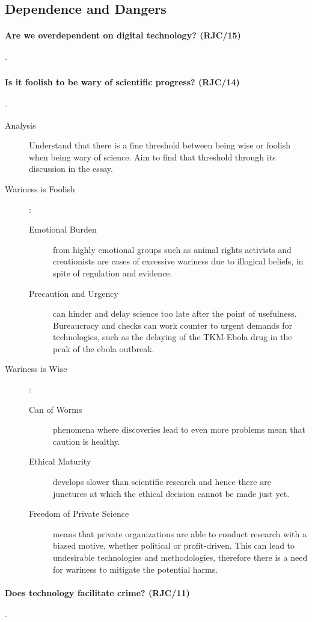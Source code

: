 \documentclass[../../main]{subfiles}
\begin{document}
\subsection{Dependence and Dangers}

\paragraph{Are we overdependent on digital technology? (RJC/15)}-

\paragraph{Is it foolish to be wary of scientific progress? (RJC/14)}-

\begin{description}
	\item[Analysis] Understand that there is a fine threshold between being wise or foolish when being wary of science. Aim to find that threshold through its discussion in the essay.
	\item[Wariness is Foolish] :
		\begin{description}
			\item[Emotional Burden] from highly emotional groups such as animal rights activists and creationists are cases of excessive wariness due to illogical beliefs, in spite of regulation and evidence.
			\item[Precaution and Urgency] can hinder and delay science too late after the point of usefulness. Bureaucracy and checks can work counter to urgent demands for technologies, such as the delaying of the TKM-Ebola drug in the peak of the ebola outbreak.
		\end{description}
	\item[Wariness is Wise] :
		\begin{description}
			\item[Can of Worms] phenomena where discoveries lead to even more problems mean that caution is healthy.
			\item[Ethical Maturity] develops slower than scientific research and hence there are junctures at which the ethical decision cannot be made just yet.
			\item[Freedom of Private Science] means that private organizations are able to conduct research with a biased motive, whether political or profit-driven. This can lead to undesirable technologies and methodologies, therefore there is a need for wariness to mitigate the potential harms.
		\end{description}
\end{description}

\paragraph{Does technology facilitate crime? (RJC/11)}-
\end{document}
